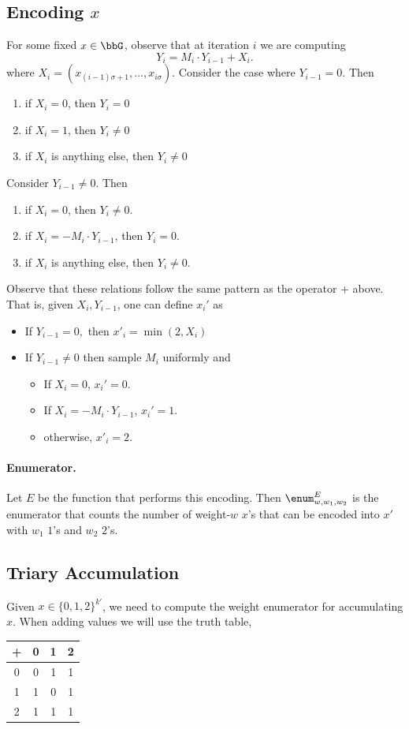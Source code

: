 \subsection{Encoding $x$} For some fixed $x\in \bbG$, observe that at iteration $i$ we are computing 
$$
    Y_i=M_i \cdot Y_{i-1} + X_i.
$$
where $X_i=(x_{(i-1)\sigma+1},...,x_{i\sigma})$.
Consider the case where $Y_{i-1}=0$. Then
\begin{enumerate}
    \item if $X_i=0$, then $Y_i=0$
    \item if $X_i=1$, then $Y_i\neq 0$
    \item if $X_i$ is anything else, then $Y_i\neq 0$
\end{enumerate}
Consider $Y_{i - 1} \neq 0$. Then
\begin{enumerate}
    \item if $X_i=0$, then $Y_i\neq 0$.
    \item if $X_i=-M_i\cdot Y_{i-1}$, then $Y_i=0$.
    \item if $X_i$ is anything else, then $Y_i\neq 0$.
\end{enumerate}
Observe that these relations follow the same pattern as the operator + above. That is, given $X_i,Y_{i-1}$, one can define $x_i'$ as 
\begin{itemize}
    \item If $Y_{i-1}=0,$ then $x'_i=\min(2,X_i)$
    \item If $Y_{i-1}\neq 0$ then sample $M_i$ uniformly and
    \begin{itemize}
        \item If $X_i=0$, $x_i'=0$.
        \item If $X_i=-M_i\cdot Y_{i-1}$, $x_i'=1$.
        \item otherwise, $x'_i = 2$.
    \end{itemize}
\end{itemize}

\paragraph{Enumerator.} Let $E$ be the function that performs this encoding. Then $\enum^{E}_{w,w_1,w_2}$ is the enumerator that counts the number of weight-$w$ $x$'s that can be encoded into $x'$ with $w_1$ $1$'s and $w_2$ $2$'s. 

\subsection{Triary Accumulation} Given $x\in \{0,1,2\}^{k'}$, we need to compute the weight enumerator for accumulating $x$. When adding values we will use the truth table,
\begin{center}
    \begin{tabular}{c|ccc}
        + & 0&1&2 \\\hline
        0 & 0&1&1 \\
        1 & 1&0&1 \\
        2 & 1&1&1 \\
    \end{tabular}
\end{center}

